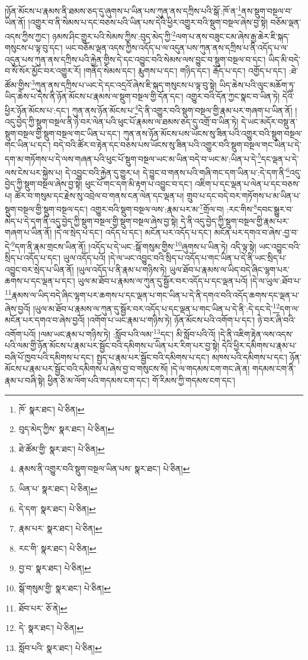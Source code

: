 །ཉོན་མོངས་པ་རྣམས་ནི་ཐམས་ཅད་དུ་ཞུགས་པ་ཡིན་པས་ཀུན་ནས་དཀྲིས་པའི་སྒོ་:ཁོ་ན་\footnote{ཁོ་  སྣར་ཐང་།  པེ་ཅིན། }ནས་སྡུག་བསྔལ་བ་ཡིན་ནོ། །འགྱུར་བ་ནི་སེམས་པ་དང་བཅས་པའི་ཡིན་པས་དེའི་ཕྱིར་འགྱུར་བའི་སྡུག་བསྔལ་ཞེས་བྱ་སྟེ། བཅོམ་ལྡན་འདས་ཀྱིས་ཀྱང་། ཉམས་ཤིང་གྱུར་པའི་སེམས་ཀྱིས་:བུད་མེད་ཀྱི་\footnote{བུད་མེད་ཀྱིས་  སྣར་ཐང་།  པེ་ཅིན། }ལག་པ་ནས་བཟུང་ངམ་ཞེས་རྒྱ་ཆེར་ཇི་སྐད་གསུངས་པ་ལྟ་བུ་དང་། ཡང་བཅོམ་ལྡན་འདས་ཀྱིས་འདོད་པ་ལ་འདུན་པས་ཀུན་ནས་དཀྲིས་པ་ནི་འདོད་པ་ལ་འདུན་པས་ཀུན་ནས་དཀྲིས་པའི་རྐྱེན་གྱིས་དེ་དང་འབྱུང་བའི་སེམས་ལས་བྱུང་བ་སྡུག་བསྔལ་བ་དང་། ཡིད་མི་བདེ་བ་སོ་སོར་མྱོང་བར་འགྱུར་རོ། །གནོད་སེམས་དང་། རྨུགས་པ་དང་། གཉིད་དང་། རྒོད་པ་དང་། འགྱོད་པ་དང་། :ཐེ་ཚོམ་གྱིས་\footnote{ཐེ་ཚོམ་གྱི་  སྣར་ཐང་།  པེ་ཅིན། }ཀུན་ནས་དཀྲིས་པ་ཡང་དེ་དང་འདྲའོ་ཞེས་ཇི་སྐད་གསུངས་པ་ལྟ་བུ་སྟེ། ཡིད་ཆེས་པའི་ལུང་མཆོག་ཏུ་ཡིད་ཆེས་པ་དེས་ནི་ཉོན་མོངས་པ་རྣམས་ལ་སྡུག་བསྔལ་གྱི་དོན་དང་། འགྱུར་བའི་དོན་ཀྱང་སྣང་བ་ཡིན་ཏེ། དེའི་ཕྱིར་ཉོན་མོངས་པ་:དང་། ཀུན་ནས་ཉོན་མོངས་པ་\footnote{རྣམས་ནི་འགྱུར་བའི་སྡུག་བསྔལ་ཡིན་པས་  སྣར་ཐང་།  པེ་ཅིན། }དེ་ནི་འགྱུར་བའི་སྡུག་བསྔལ་གྱི་རྣམ་པར་གཞག་པ་ཡིན་ནོ། །འདུ་བྱེད་ཀྱི་སྡུག་བསྔལ་ནི་ཉེ་བར་ལེན་པའི་ཕུང་པོ་རྣམས་ལ་ཐམས་ཅད་དུ་འགྲོ་བ་ཡིན་ཏེ། དེ་ཡང་མདོར་བསྡུ་ན་སྡུག་བསྔལ་གྱི་སྡུག་བསྔལ་གང་ཡིན་པ་དང་། ཀུན་ནས་ཉོན་མོངས་པས་ཡོངས་སུ་ཟིན་པའི་འགྱུར་བའི་སྡུག་བསྔལ་གང་ཡིན་པ་དང་། བདེ་བའི་ཚོར་བ་རྟེན་དང་བཅས་པས་ཡོངས་སུ་ཟིན་པའི་འགྱུར་བའི་སྡུག་བསྔལ་གང་ཡིན་པ་དེ་དག་མ་གཏོགས་པ་དེ་ལས་གཞན་པའི་ཕུང་པོ་སྡུག་བསྔལ་ཡང་མ་ཡིན་བདེ་བ་ཡང་མ་:ཡིན་པ་དེ་\footnote{ཡིན་པ་  སྣར་ཐང་།  པེ་ཅིན། }དང་ལྡན་པ་དེ་ལས་ངེས་པར་སྐྱེས་པ། དེ་འབྱུང་བའི་རྐྱེན་དུ་གྱུར་པ། དེ་བྱུང་བ་གནས་པའི་གཞི་གང་དག་ཡིན་པ་:དེ་དག་ནི་\footnote{དེ་དག་  སྣར་ཐང་།  པེ་ཅིན། }འདུ་བྱེད་ཀྱི་སྡུག་བསྔལ་ཞེས་བྱ་སྟེ། ཕུང་པོ་གང་དག་མི་རྟག་པ་འབྱུང་བ་དང་། འཇིག་པ་དང་ལྡན་པ་ལེན་པ་དང་བཅས་པ། ཚོར་བ་གསུམ་དང་རྗེས་སུ་འབྲེལ་བ་གནས་ངན་ལེན་དང་ལྡན་པ། གྲུབ་པ་དང་བདེ་བར་གཏོགས་པ་མ་ཡིན་པ་སྡུག་བསྔལ་གྱི་སྡུག་བསྔལ་དང་། འགྱུར་བའི་སྡུག་བསྔལ་ལས་:རྣམ་པར་མ་\footnote{རྣམ་པར་  སྣར་ཐང་།  པེ་ཅིན། }གྲོལ་བ། :རང་གིས་\footnote{རང་གི་  སྣར་ཐང་།  པེ་ཅིན། }དབང་སྒྱུར་བ་མེད་པ་དེ་དག་ནི་འདུ་བྱེད་ཀྱི་སྡུག་བསྔལ་གྱི་སྡུག་བསྔལ་ཞེས་བྱ་སྟེ། དེ་ནི་འདུ་བྱེད་ཀྱི་སྡུག་བསྔལ་གྱི་རྣམ་པར་གཞག་པ་ཡིན་ནོ། །དེ་ལ་སྲེད་པ་དང་། འདོད་པ་དང་། མངོན་པར་འདོད་པ་དང་། མངོན་པར་དགའ་བ་ཞེས་:བྱ་བ་དེ་\footnote{བྱ་བ་  སྣར་ཐང་།  པེ་ཅིན། }དག་ནི་རྣམ་གྲངས་ཡིན་ནོ། །འདོད་པ་དེ་ཡང་:སྒོ་གསུམ་གྱིས་\footnote{སྒོ་གསུམ་གྱི་  སྣར་ཐང་།  པེ་ཅིན། }ཞུགས་པ་ཡིན་ཏེ། འདི་ལྟ་སྟེ། ཡང་འབྱུང་བའི་སྲིད་པ་འདོད་པ་དང་། ཡུལ་འདོད་པའོ། །དེ་ལ་ཡང་འབྱུང་བའི་སྲིད་པ་འདོད་པ་གང་ཡིན་པ་དེ་ནི་ཡང་སྲིད་པ་འབྱུང་བར་སྲེད་པ་ཡིན་ནོ། །ཡུལ་འདོད་པ་ནི་རྣམ་པ་གཉིས་ཏེ། ཡུལ་ཐོབ་པ་རྣམས་ལ་ཡིད་བདེ་ཞིང་ལྷག་པར་ཆགས་པ་དང་ལྡན་པ་དང་། ཡུལ་མ་ཐོབ་པ་རྣམས་ལ་ཀུན་དུ་སྦྱོར་བར་འདོད་པ་དང་ལྡན་པའོ། །དེ་ལ་ཡུལ་:ཐོབ་པ་\footnote{ཐོབ་པར་  ཅོ་ནེ། }རྣམས་ལ་ཡིད་བདེ་ཞིང་ལྷག་པར་ཆགས་པ་དང་ལྡན་པ་གང་ཡིན་པ་དེ་ནི་དགའ་བའི་འདོད་ཆགས་དང་ལྡན་པ་ཞེས་བྱའོ། །ཡུལ་མ་ཐོབ་པ་རྣམས་ལ་ཀུན་དུ་སྦྱོར་བར་འདོད་པ་དང་ལྡན་པ་གང་ཡིན་པ་དེ་ནི་:དེ་དང་དེ་\footnote{དེ་  སྣར་ཐང་།  པེ་ཅིན། }དག་ལ་མངོན་པར་དགའ་བ་ཞེས་བྱའོ། །འགོག་པ་ཡང་རྣམ་པ་གཉིས་ཏེ། ཉོན་མོངས་པའི་འགོག་པ་དང་། ཉེ་བར་ཞི་བའི་འགོག་པའོ། །ལམ་ཡང་རྣམ་པ་གཉིས་ཏེ། :སློབ་པའི་ལམ་\footnote{སློབ་པའི་  སྣར་ཐང་།  པེ་ཅིན། }དང་། མི་སློབ་པའི་འོ། །དེ་ནི་འཇིག་རྟེན་ལས་འདས་པའི་ལམ་གྱི་ཉོན་མོངས་པ་རྣམ་པར་སྦྱོང་བའི་དམིགས་པ་ཡིན་པར་རིག་པར་བྱ་སྟེ། དེའི་ཕྱིར་དམིགས་པ་རྣམ་པ་བཞི་པོ་ཁྱབ་པའི་དམིགས་པ་དང་། སྤྱད་པ་རྣམ་པར་སྦྱོང་བའི་དམིགས་པ་དང་། མཁས་པའི་དམིགས་པ་དང་། ཉོན་མོངས་པ་རྣམ་པར་སྦྱོང་བའི་དམིགས་པ་ཞེས་བྱ་བ་གསུངས་སོ། །དེ་ལ་གདམས་ངག་གང་ཞེ་ན། གདམས་ངག་ནི་རྣམ་པ་བཞི་སྟེ། ཕྱིན་ཅི་མ་ལོག་པའི་གདམས་ངག་དང་། གོ་རིམས་ཀྱི་གདམས་ངག་དང་། 